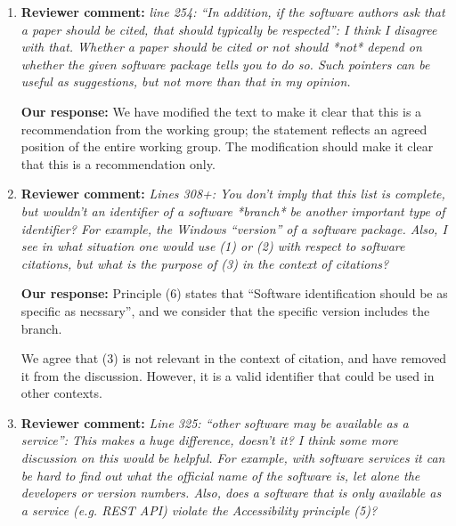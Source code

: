 \documentclass{article}
\newcommand{\katznote}[1]{ {\textcolor{blue} { ***DSK: #1 }}} %
\newcommand{\niemnote}[1]{ {\textcolor{orange} { ***KEN: #1 }}} %
\begin{document}
\begin{enumerate}
\textbf{Our response:}

\niemnote{I think we have some citations about the importance of software to research we can add here (e.g., Hannay 2009), as well as the fact that research results depend on citation\slash proper version (Sufi 2014, Sandve 2013, Wilson 2014), and that errors in software or environment variations can effect results (Morin 2012, Soergel 2015). Although we probably want to avoid overlap with the challenge paper.} \katznote{basically, what is important is up the authors to define, and then reviewers to agree with, all in the context of community practices and `standards'}

\niemnote{Add discussion of both points; Dan's note is already there in the text. I will work on this.}

\item \textbf{Reviewer comment:}
\emph{line 254: ``In addition, if the software authors ask that a paper should be cited, that should typically be respected'': I think I disagree with that. Whether a paper should be cited or not should *not* depend on whether the given software package tells you to do so. Such pointers can be useful as suggestions, but not more than that in my opinion.}

\textbf{Our response:}
We have modified the text to make it clear that this is a recommendation from the working group; the statement reflects an agreed position of the entire working group. The modification should make it clear that this is a recommendation only.

\item \textbf{Reviewer comment:}
\emph{Lines 308+: You don't imply that this list is complete, but wouldn't an identifier of a software *branch* be another important type of identifier? For example, the Windows ``version'' of a software package. Also, I see in what situation one would use (1) or (2) with respect to software citations, but what is the purpose of (3) in the context of citations?}

\textbf{Our response:}
Principle (6) states that ``Software identification should be as specific as necssary'', and we consider that the specific version includes the branch.

We agree that (3) is not relevant in the context of citation, and have removed it from the discussion.
However, it is a valid identifier that could be used in other contexts.

\item \textbf{Reviewer comment:}
\emph{Line 325: ``other software may be available as a service'': This makes a huge difference, doesn't it? I think some more discussion on this would be helpful. For example, with software services it can be hard to find out what the official name of the software is, let alone the developers or version numbers. Also, does a software that is only available as a service (e.g. REST API) violate the Accessibility principle (5)?}


\end{enumerate}
\end{document}
